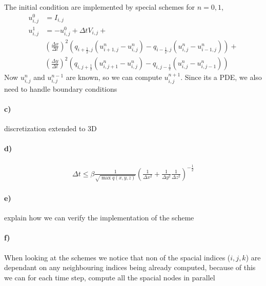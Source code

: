 \documentclass[11pt,a4paper]{article}
\begin{document}
The initial condition are implemented by special schemes for $n = 0,1$,
\begin{align}
u^0_{i,j} &= I_{i,j} \\
 u^1_{i,j} &= -u^0_{i,j} + \Delta t V_{i,j} + \\
& \left(\frac{\Delta x}{\Delta t} \right)^2 \left(q_{i+\frac{1}{2},j}(u^n_{i+1,j}-u^n_{i,j})-q_{i-\frac{1}{2},j}(u^n_{i,j}-u^n_{i-1,j})\right)+ \\
& \left(\frac{\Delta y}{\Delta t} \right)^2\left(q_{i,j+\frac{1}{2}}(u^n_{i,j+1}-u^n_{i,j})-q_{i,j-\frac{1}{2}}(u^n_{i,j}-u^n_{i,j-1})\right)
\end{align}
Now $u^{n}_{i,j}$ and $u^{n-1}_{i,j}$ are known, so we can compute $u^{n+1}_{i,j}$. Since its a PDE, we also need to handle boundary conditions
\paragraph*{c)}
discretization extended to 3D

\paragraph*{d)}
\begin{align}
\Delta t \leqslant \beta \frac{1}{\sqrt{\max q(x,y,z)}}\left(\frac{1}{\Delta x^2}+\frac{1}{\Delta y^2}\frac{1}{\Delta z^2}\right)^{-\frac{1}{2}}
\end{align}

\paragraph*{e)}
explain how we can verify the implementation of the scheme

\paragraph*{f)}
When looking at the schemes we notice that non of the spacial indices ($i,j,k$) are dependant on any neighbouring indices being already computed, because of this we can for each time step, compute all the spacial nodes in parallel
\end{document}

